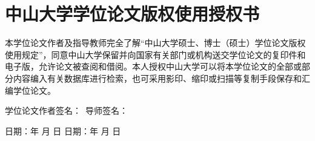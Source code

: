 \chapter{中山大学学位论文版权使用授权书}

本学位论文作者及指导教师完全了解“中山大学硕士、博士（硕士）学位论文版权使用规定”，同意中山大学保留并向国家有关部门或机构送交学位论文的复印件和电子版，允许论文被查阅和借阅。本人授权中山大学可以将本学位论文的全部或部分内容编入有关数据库进行检索，也可采用影印、缩印或扫描等复制手段保存和汇编学位论文。

\vskip 20pt
\noindent
学位论文作者签名：\qquad\qquad\qquad\qquad\qquad\qquad\qquad\quad\,\: 导师签名：

\noindent
日期：\qquad 年 \quad 月 \quad 日 \qquad\qquad\qquad\qquad\qquad\qquad\qquad 日期：\qquad 年 \quad 月 \quad 日
\endinput